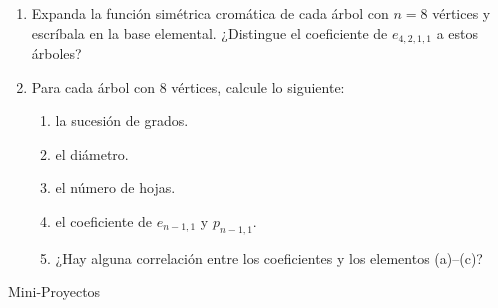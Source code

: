 \documentclass{article}
\begin{document}
\begin{enumerate}
    \item Expanda la función simétrica cromática de cada árbol con $n=8$ vértices y escríbala en la base elemental. ¿Distingue el coeficiente de $e_{4,2,1,1}$ a estos árboles?

    \item Para cada árbol con 8 vértices, calcule lo siguiente:
    \begin{enumerate}
    \item la sucesión de grados.
    \item el diámetro.
    \item el número de hojas.
    \item el coeficiente de $e_{n-1,1}$ y $p_{n-1,1}$.
    \item ¿Hay alguna correlación entre los coeficientes y los elementos (a)--(c)?
    \end{enumerate}
\end{enumerate}
\centerline{\Large Mini-Proyectos}
\end{document}
